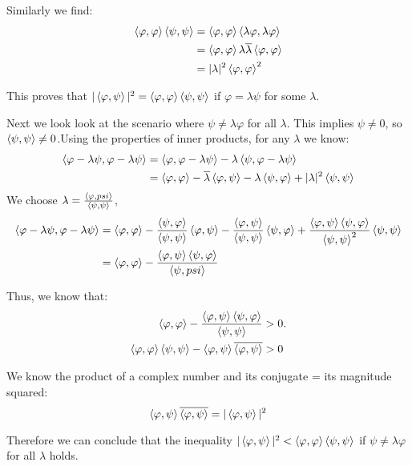 \documentclass{article}
\renewcommand{\phi}{\varphi}
\theoremstyle{plain}
\numberwithin{thm}{section}
\theoremstyle{definition}
\begin{document}
\begin{enumerate}
    Similarly we find:
    \begin{align*}
        \braket{\phi, \phi}\braket{\psi, \psi} &= \braket{\phi, \phi}\braket{\lambda\phi,\lambda\phi} \\
        & = \braket{\phi,\phi}\lambda\overline{\lambda}\braket{\phi,\phi} \\
        & = |\lambda|^2\braket{\phi,\phi}^2
    \end{align*}
    
    This proves that $|\braket{\phi, \psi}|^2=\braket{\phi,\phi}\braket{\psi,\psi}$ if $\phi=\lambda\psi$ for some $\lambda$.

    Next we look look at the scenario where $\psi \neq \lambda\phi$ for all $\lambda$. This implies $\psi \neq 0$, so $\braket{\psi,\psi}\neq0$.Using the properties of inner products, for any $\lambda$ we know:
    \begin{align*}
        \braket{\phi-\lambda\psi,\phi-\lambda\psi} &=\braket{\phi,\phi-\lambda\psi}-\lambda\braket{\psi,\phi-\lambda\psi} \\
        &=\braket{\phi,\phi}-\overline{\lambda}\braket{\phi,\psi}-\lambda\braket{\psi,\phi}+|\lambda|^2\braket{\psi,\psi}
    \end{align*}
    We choose $\lambda= \frac{\braket{\phi,psi}}{\braket{\psi,\psi}}$,
    \begin{align*}
        \braket{\phi-\lambda\psi,\phi-\lambda\psi} &= \braket{\phi,\phi}-\frac{\braket{\psi,\phi}}{\braket{\psi,\psi}}\braket{\phi,\psi}-\frac{\braket{\phi,\psi}}{\braket{\psi,\psi}}\braket{\psi,\phi}+\frac{\braket{\phi,\psi}\braket{\psi,\phi}}{\braket{\psi,\psi}^2}\braket{\psi,\psi} \\
        &= \braket{\phi,\phi}-\frac{\braket{\phi,\psi}\braket{\psi,\phi}}{\braket{\psi,psi}}
    \end{align*}

    Thus, we know that:
    \begin{align*}
        \braket{\phi,\phi}-\frac{\braket{\phi,\psi}\braket{\psi,\phi}}{\braket{\psi,\psi}} &>0. \\
        \braket{\phi,\phi}\braket{\psi,\psi}-\braket{\phi,\psi}\overline{\braket{\phi,\psi}}&>0
    \end{align*}
    
    We know the product of a complex number and its conjugate = its magnitude squared: $$\braket{\phi,\psi}\overline{\braket{\phi,\psi}} = |\braket{\phi,\psi}|^2$$
    
    Therefore we can conclude that the inequality $|\braket{\phi,\psi}|^2<\braket{\phi,\phi}\braket{\psi,\psi}$ if $\psi \neq \lambda\phi$ for all $\lambda$ holds.\\


\end{enumerate}
\end{document}

